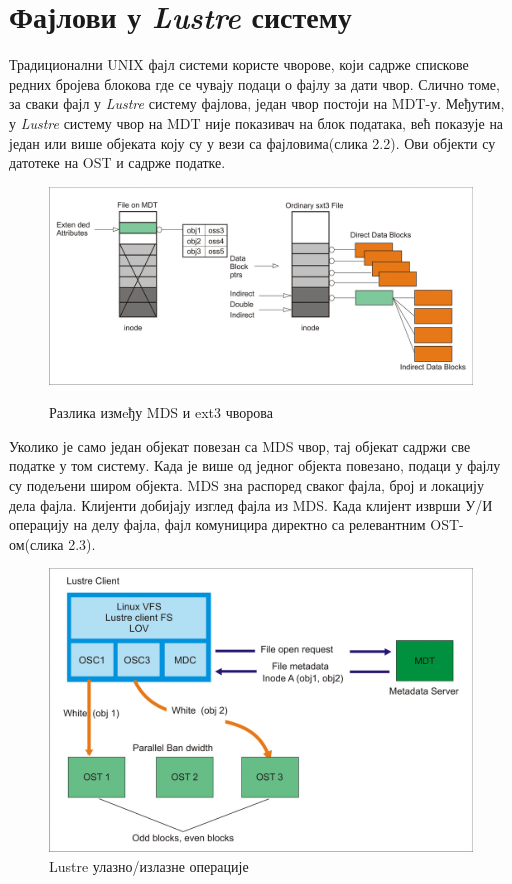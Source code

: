 \section{Фајлови у   \textit{Lustre} систему}
Традиционални UNIX фајл системи користе чворове, који садрже спискове редних бројева блокова
где се чувају подаци о  фајлу за дати чвор. Слично томе, за сваки фајл у   \textit{Lustre} систему фајлова,
један чвор постоји на MDT-у. Међутим, у   \textit{Lustre} систему чвор на MDT није показивач на блок података, већ показује на један или више објеката коју су у вези са фајловима(слика 2.2). Ови објекти су датотеке на OST и садрже податке.

\begin{figure}[h!]
  \centering
      \includegraphics[width=1\textwidth]{slike/lustre_files.png}\\[1cm]
  \caption{Разлика измeђу MDS и ext3 чворова}
\end{figure}
\newpage

Уколико је само један објекат повезан са MDS чвор, тај објекат садржи све податке
у том систему. Када је више од једног објекта повезано, подаци у фајлу 
су подељени широм објекта. MDS зна распоред сваког фајла, број и локацију дела фајла. 
Клијенти добијају изглед фајла из MDS. Када клијент изврши  У/И операцију на делу фајла, 
фајл комуницира директно са релевантним OST-ом(слика 2.3). 

\begin{figure}[h!]
  \centering
      \includegraphics[width=1\textwidth]{slike/lustre_file_i_o.png}
  \caption{Lustre улазно/излазне операције}
\end{figure}

